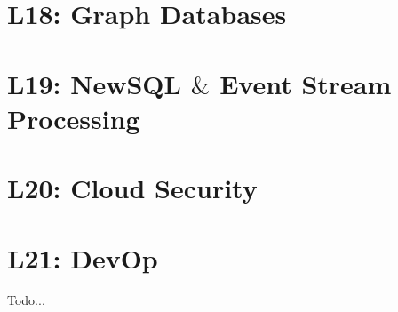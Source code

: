 \documentclass[a4paper]{article}
\begin{document}
\begin{multicols}{3}
\section*{L18: Graph Databases}

\section*{L19: NewSQL $\&$ Event Stream Processing}

\section*{L20: Cloud Security}

\section*{L21: DevOp}

Todo...

\vspace*{\fill}
    \pagebreak
\end{multicols}
\end{document}
